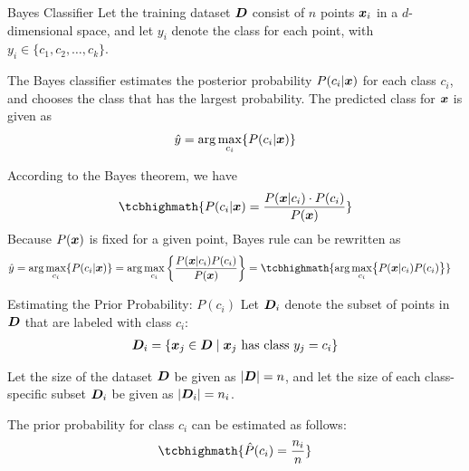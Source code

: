 
\date{Chapter 18: Probabilistic Classification}

\begin{frame}
\titlepage
\end{frame}


\begin{frame}{Bayes Classif\/{i}er}
Let the training dataset ${\boldsymbol D}$ consist of $n$ points ${\boldsymbol x}_i$ in a
$d$-dimensional space, and let $y_i$ denote the class for each
point, with $y_i \in \{c_1,c_2,\ldots,c_k\}$. 

\bigskip
The Bayes classif\/{i}er
 estimates the posterior probability
$P(c_i | {\boldsymbol x})$ for each class $c_i$, and chooses the class that
has the largest probability. The predicted class for ${\boldsymbol x}$ is
given as
\begin{align*}
    \hat{y} = \arg\max_{c_i} \{ P(c_i|{\boldsymbol x}) \}
\end{align*}

According to the Bayes theorem, we have
\begin{align*}
\tcbhighmath{
    P(c_i|\bx) = \frac{P(\bx|c_i) \cdot P(c_i)}{P(\bx)}
}
\end{align*}
Because $P({\boldsymbol x})$ is f\/{i}xed for a given point, Bayes rule 
can be rewritten as
\begin{align*}
    \hy & = \arg\max_{c_i} \{ P(c_i|\bx) \} 
    = \arg\max_{c_i} \lB\{ {P(\bx|c_i)P(c_i) \over P(\bx)}
    \rB\}
     = 
\tcbhighmath{
\arg\max_{c_i} \bigr\{ P(\bx|c_i)P(c_i) \bigl\}
}
\end{align*}
\end{frame}



\begin{frame}{Estimating the Prior Probability: $P(c_i)$}
 Let
${\boldsymbol D}_i$ denote the subset of points in ${\boldsymbol D}$ that are labeled with
class $c_i$:
\begin{align*}
    {\boldsymbol D}_i = \{{\boldsymbol x}_{j} \in {\boldsymbol D} \mid {\boldsymbol x}_{j} \mbox{ has
    class } y_{j}=c_i \}
\end{align*}

\bigskip
Let the size of the dataset ${\boldsymbol D}$ be given as $|{\boldsymbol D}| = n$, and let
the size of each class-specif\/{i}c subset ${\boldsymbol D}_i$ be given as
$|{\boldsymbol D}_i| = n_i$. 

\bigskip
The prior probability for class $c_i$ can be
estimated as follows:
\begin{align*}
\tcbhighmath{
  \hP(c_i) = \frac{n_i}{n}
}
\end{align*}
\end{frame}


